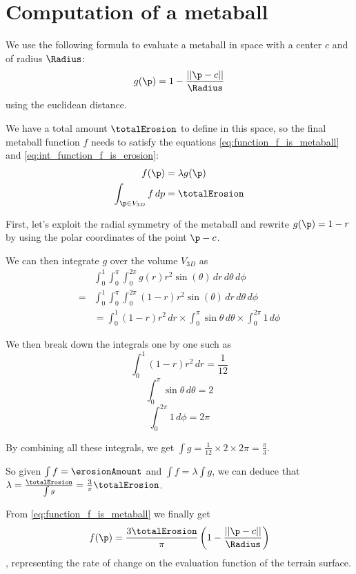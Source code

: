 %
\section{Computation of a metaball}
\label{sec:erosion_appendix_metaball}
We use the following formula to evaluate a metaball in space with a center $c$ and of radius $\Radius$:
$$ g(\p) = 1 - \frac{||\p - c||}{\Radius} $$
using the euclidean distance.

We have a total amount $\totalErosion$ to define in this space, so the final metaball function $f$ needs to satisfy the equations \eqref{eq:function_f_is_metaball} and \eqref{eq:int_function_f_is_erosion}:
\begin{align}
\label{eq:function_f_is_metaball}
f(\p) &= \lambda g(\p) \\
\label{eq:int_function_f_is_erosion}
\int_{\p \in V_{3D}}{f \, dp} &= \totalErosion
\end{align}

First, let's exploit the radial symmetry of the metaball and rewrite $g(\p) = 1 - r$ by using the polar coordinates of the point $\p - c$.

We can then integrate $g$ over the volume $V_{3D}$ as 
\begin{align}
&\int_{0}^{1}{ \int_{0}^{\pi}{ \int_{0}^{2\pi}{ g(r) r^2 \sin(\theta)\, dr} \, d\theta} \, d\phi} \nonumber \\
= &\int_{0}^{1}{ \int_{0}^{\pi}{ \int_{0}^{2\pi}{ (1 - r) r^2 \sin(\theta)\, dr} \, d\theta} \, d\phi} \nonumber \\
&= \int_{0}^{1}{ (1 - r)r^2 \, dr} \times \int_{0}^{\pi}{ \sin{\theta} \, d\theta } \times \int_{0}^{2\pi}{ 1 \, d\phi} \nonumber
\end{align}

We then break down the integrals one by one such as 
$$ \int_{0}^{1}{ (1 - r)r^2 \, dr} = \frac{1}{12} \nonumber$$ 
$$ \int_{0}^{\pi}{ \sin{\theta} \, d\theta } = 2 \nonumber$$ 
$$ \int_{0}^{2\pi}{ 1 \, d\phi} = 2 \pi \nonumber$$

By combining all these integrals, we get $\int{g} = \frac{1}{12} \times 2 \times 2\pi = \frac{\pi}{3}$.

So given $\int{f} = \erosionAmount$ and $\int{f} = \lambda \int{g}$, we can deduce that $\lambda = \frac{\totalErosion}{\int{g}} = \frac{3}{\pi}\totalErosion$.

From \eqref{eq:function_f_is_metaball} we finally get 
\begin{align} 
\label{eq:proofErosionMetaball}
f(\p) = \frac{3 \totalErosion}{\pi} \left(1 - \frac{||\p - c||}{\Radius} \right)
\end{align}
, representing the rate of change on the evaluation function of the terrain surface.

